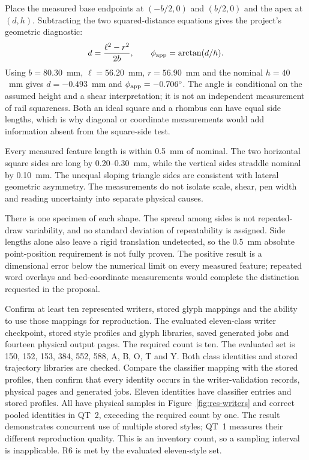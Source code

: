 Place the measured base endpoints at $(-b/2,0)$ and $(b/2,0)$ and the apex at $(d,h)$. Subtracting the two squared-distance equations gives the project's geometric diagnostic:
\begin{equation}
d=\frac{\ell^2-r^2}{2b},\qquad \phi_{\rm app}=\arctan(d/h).
\label{eq:res-apex}
\end{equation}
Using $b=80.30$~mm, $\ell=56.20$~mm, $r=56.90$~mm and the nominal $h=40$~mm gives $d=-0.493$~mm and $\phi_{\rm app}=-0.706^\circ$. The angle is conditional on the assumed height and a shear interpretation; it is not an independent measurement of rail squareness. Both an ideal square and a rhombus can have equal side lengths, which is why diagonal or coordinate measurements would add information absent from the square-side test.

Every measured feature length is within 0.5~mm of nominal. The two horizontal square sides are long by 0.20--0.30~mm, while the vertical sides straddle nominal by 0.10~mm. The unequal sloping triangle sides are consistent with lateral geometric asymmetry. The measurements do not isolate scale, shear, pen width and reading uncertainty into separate physical causes.

There is one specimen of each shape. The spread among sides is not repeated-draw variability, and no standard deviation of repeatability is assigned. Side lengths alone also leave a rigid translation undetected, so the 0.5~mm absolute point-position requirement is not fully proven. The positive result is a dimensional error below the numerical limit on every measured feature; repeated word overlays and bed-coordinate measurements would complete the distinction requested in the proposal.

Confirm at least ten represented writers, stored glyph mappings and the ability to use those mappings for reproduction.
The evaluated eleven-class writer checkpoint, stored style profiles and glyph libraries, saved generated jobs and fourteen physical output pages.
The required count is ten. The evaluated set is 150, 152, 153, 384, 552, 588, A, B, O, T and Y. Both class identities and stored trajectory libraries are checked.
Compare the classifier mapping with the stored profiles, then confirm that every identity occurs in the writer-validation records, physical pages and generated jobs.
Eleven identities have classifier entries and stored profiles. All have physical samples in Figure~\ref{fig:res-writers} and correct pooled identities in QT~2, exceeding the required count by one.
The result demonstrates concurrent use of multiple stored styles; QT~1 measures their different reproduction quality.
This is an inventory count, so a sampling interval is inapplicable. R6 is met by the evaluated eleven-style set.

